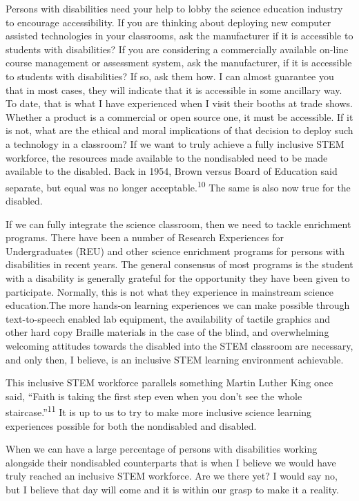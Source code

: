 \documentclass[11.5pt]{sig-alternate} %
\begin{document}
\begin{large}
Persons with disabilities need your help to lobby the science education industry to encourage accessibility. If you are thinking about deploying new computer assisted technologies in your classrooms, ask the manufacturer if it is accessible to students with disabilities? If you are considering a commercially available on-line course management or assessment system, ask the manufacturer, if it is accessible to students with disabilities? If so, ask them how.  I can almost guarantee you that in most cases, they will indicate that it is accessible in some ancillary way. To date, that is what I have experienced when I visit their booths at trade shows. Whether a product is a commercial or open source one, it must be accessible. If it is not, what are the ethical and moral implications of that decision to deploy such a technology in a classroom?  If we want to truly achieve a fully inclusive STEM workforce, the resources made available to the nondisabled need to be made available to the disabled. Back in 1954, Brown versus Board of Education said separate, but equal was no longer acceptable.\textsuperscript{10} The same is also now true for the disabled. 

If we can fully integrate the science classroom, then we need to tackle enrichment programs. There have been a number of Research Experiences for Undergraduates (REU) and other science enrichment programs for persons with disabilities in recent years. The general consensus of most programs is the student with a disability is generally grateful for the opportunity they have been given to participate. Normally, this is not what they experience in mainstream science education.The more hands-on learning experiences we can make possible through text-to-speech enabled lab equipment, the availability of tactile graphics and other hard copy Braille materials in the case of the blind, and overwhelming welcoming attitudes towards the disabled into the STEM classroom are necessary, and only then, I believe, is an inclusive STEM learning environment achievable.

This inclusive STEM workforce parallels something Martin Luther King once said, “Faith is taking the first step even when you don’t see the whole staircase.”\textsuperscript{11} It is up to us to try to make more inclusive science learning experiences possible for both the nondisabled and disabled.

When we can have a large percentage of persons with disabilities working alongside their nondisabled counterparts that is when I believe we would have truly reached an inclusive STEM workforce. Are we there yet? I would say no, but I believe that day will come and it is within our grasp to make it a reality.

\end{large}
\clearpage
\end{document}
